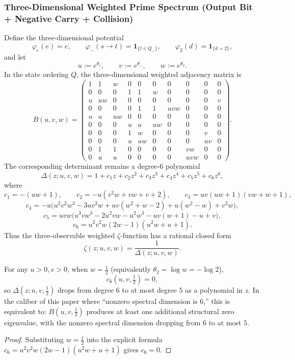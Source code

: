 \subsubsection{Three-Dimensional Weighted Prime Spectrum (Output Bit + Negative Carry + Collision)}
Define the three-dimensional potential
\[
\varphi_e(e)=e,\qquad
\varphi_-(s\to t)=\mathbf{1}_{\{t\in Q_-\}},\qquad
\varphi_2(d)=\mathbf{1}_{\{d=2\}},
\]
and let
\[
u:=e^{\theta_e},\qquad v:=e^{\theta_-},\qquad w:=e^{\theta_2}.
\]
In the state ordering $Q$, the three-dimensional weighted adjacency matrix is
\[
B(u,v,w)=
\begin{pmatrix}
1 & 1 & w & 0 & 0 & 0 & 0 & 0 & 0 & 0\\
0 & 0 & 0 & 1 & 1 & w & 0 & 0 & 0 & 0\\
u & uw & 0 & 0 & 0 & 0 & 0 & 0 & 0 & v\\
0 & 0 & 0 & 0 & 1 & 1 & uvw & 0 & 0 & 0\\
u & u & uw & 0 & 0 & 0 & 0 & 0 & 0 & 0\\
0 & 0 & 0 & u & u & uw & 0 & 0 & 0 & 0\\
0 & 0 & 0 & 1 & w & 0 & 0 & 0 & v & 0\\
0 & 0 & 0 & u & uw & 0 & 0 & 0 & uv & 0\\
0 & 1 & 1 & 0 & 0 & 0 & 0 & vw & 0 & 0\\
0 & u & u & 0 & 0 & 0 & 0 & uvw & 0 & 0
\end{pmatrix}.
\]
The corresponding determinant remains a degree-6 polynomial
\[
\Delta(z;u,v,w)=1+c_1z+c_2z^2+c_3z^3+c_4z^4+c_5z^5+c_6z^6,
\]
where
\[
c_1=-(uw+1),\qquad
c_2=-u(v^2w+vw+v+2),\qquad
c_3=uv(uw+1)(vw+w+1),
\]
\[
c_4=-u\bigl(u^2v^2w^3-3uv^2w+uv(w^2+w-2)+u(w^2-w)+v^2w\bigr),
\]
\[
c_5=uvw\bigl(u^3 v w^3-2u^2 v w-u^2 w^3-u v(w+1)-u+v\bigr),
\]
\[
c_6=u^2 v^2 w(2w-1)(u^2w+u+1).
\]
Thus the three-observable weighted $\zeta$-function has a rational closed form
\[
\zeta(z;u,v,w)=\frac{1}{\Delta(z;u,v,w)}.
\]
\begin{proposition}[Internal critical hyperplane \texorpdfstring{$w=\frac12$}{w=1/2}: first-order collapse of the effective spectral dimension]\label{prop:sync-kernel-3d-critical-w-half}
For any \(u>0,v>0\), when \(w=\tfrac12\) (equivalently \(\theta_2=\log w=-\log 2\)),
\[
c_6(u,v,\tfrac12)=0,
\]
so
\(
\Delta(z;u,v,\tfrac12)
\)
drops from degree \(6\) to at most degree \(5\) as a polynomial in \(z\).
In the caliber of this paper where ``nonzero spectral dimension is \(6\),'' this is equivalent to: \(B(u,v,\tfrac12)\) produces at least one additional structural zero eigenvalue,
with the nonzero spectral dimension dropping from \(6\) to at most \(5\).
\end{proposition}
\begin{proof}
Substituting \(w=\tfrac12\) into the explicit formula \(c_6=u^2v^2w(2w-1)(u^2w+u+1)\) gives \(c_6=0\). \qedhere
\end{proof}

